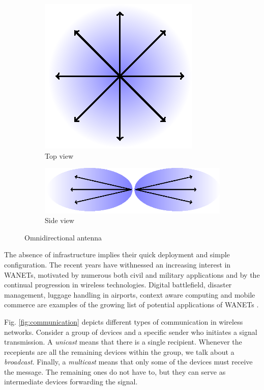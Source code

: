 \begin{figure}[htb!]
    \centering
    \begin{subfigure}[b]{0.35\textwidth}
        \includegraphics{figurer/omni-top.eps}
        \caption{Top view}
        \label{fig:omni-top}
    \end{subfigure}
    \begin{subfigure}[b]{0.55\textwidth}
        \includegraphics{figurer/omni-side.eps}
        \caption{Side view}
        \label{fig:omni-side}
    \end{subfigure}
  \label{fig:omni}
  \caption{Omnidirectional antenna}
\end{figure}

The absence of infrastructure implies their quick deployment and simple configuration.
The recent years have withnessed an increasing interest in WANETs, motivated by numerous both civil and military applications and by the continual progression in wireless technologies.
Digital battlefield, disaster management, luggage handling in airports, context aware computing and mobile commerce are examples of the growing list of potential applications of WANETs \cite{younis06}.

Fig. \ref{fig:communication} depicts different types of communication in wireless networks.
Consider a group of devices and a specific sender who initiates a signal transmission. 
A \emph{unicast} means that there is a single recipient.
Whenever the recepients are all the remaining devices within the group, we talk about a \emph{broadcast}.
Finally, a \emph{multicast} means that only some of the devices must receive the message. 
The remaining ones do not have to, but they can serve as intermediate devices forwarding the signal.

